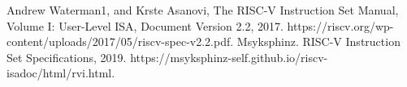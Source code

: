 \documentclass[a4paper, 12pt, fleqn]{article}
\begin{document}
	
	 \selectfont    %
	\onehalfspacing                 %
	
	
	
	\renewcommand{\contentsname}{Índice} %
	\tableofcontents                    \newpage
	
	\renewcommand{\nomname}{Nomenclatura} %
	\printnomenclature                  \newpage
		

	
	
	
	
	
	
	

	\begin{thebibliography}{99}
		 Andrew Waterman1, and Krste Asanovi, The RISC-V Instruction Set Manual, Volume I: User-Level ISA, Document Version 2.2, 2017. https://riscv.org/wp-content/uploads/2017/05/riscv-spec-v2.2.pdf.
		 Msyksphinz. RISC-V Instruction Set Specifications, 2019. https://msyksphinz-self.github.io/riscv-isadoc/html/rvi.html.
	\end{thebibliography}
\end{document}
